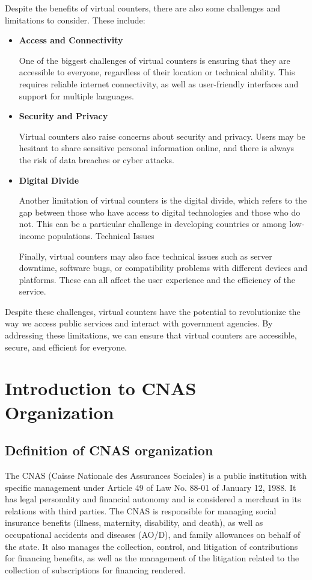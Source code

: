 Despite the benefits of virtual counters, there are also some challenges and limitations to consider. These include:
\begin{itemize}
    \item \textbf{Access and Connectivity}

One of the biggest challenges of virtual counters is ensuring that they are accessible to everyone, regardless of their location or technical ability. This requires reliable internet connectivity, as well as user-friendly interfaces and support for multiple languages.
\item \textbf{Security and Privacy}

Virtual counters also raise concerns about security and privacy. Users may be hesitant to share sensitive personal information online, and there is always the risk of data breaches or cyber attacks.
\item \textbf{Digital Divide}

Another limitation of virtual counters is the digital divide, which refers to the gap between those who have access to digital technologies and those who do not. This can be a particular challenge in developing countries or among low-income populations.
Technical Issues

Finally, virtual counters may also face technical issues such as server downtime, software bugs, or compatibility problems with different devices and platforms. These can all affect the user experience and the efficiency of the service.
\end{itemize}
Despite these challenges, virtual counters have the potential to revolutionize the way we access public services and interact with government agencies. By addressing these limitations, we can ensure that virtual counters are accessible, secure, and efficient for everyone.

\section{Introduction to CNAS Organization}
\subsection{Definition of CNAS organization}
The CNAS (Caisse Nationale des Assurances Sociales) is a public institution with specific management under Article 49 of Law No. 88-01 of January 12, 1988. It has legal personality and financial autonomy and is considered a merchant in its relations with third parties. The CNAS is responsible for managing social insurance benefits (illness, maternity, disability, and death), as well as occupational accidents and diseases (AO/D), and family allowances on behalf of the state. It also manages the collection, control, and litigation of contributions for financing benefits, as well as the management of the litigation related to the collection of subscriptions for financing rendered.

